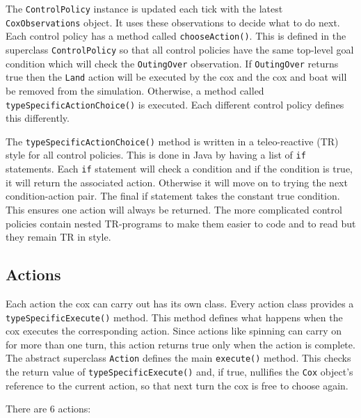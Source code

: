   The \texttt{ControlPolicy} instance is updated each tick with the latest \texttt{CoxObservations} object. It uses these observations to decide what to do next.  Each control policy has a method called \texttt{chooseAction()}. This is defined in the superclass \texttt{ControlPolicy} so that all control policies have the same top-level goal condition which will check the \texttt{OutingOver} observation. If \texttt{OutingOver} returns true then the \texttt{Land} action will be executed by the cox and the cox and boat will be removed from the simulation. Otherwise, a method called \texttt{typeSpecificActionChoice()} is executed. Each different control policy defines this differently. 
  
  The \texttt{typeSpecificActionChoice()} method is written in a teleo-reactive (TR) style for all control policies. This is done in Java by having a list of \texttt{if} statements. Each \texttt{if} statement will check a condition and if the condition is true, it will return the associated action. Otherwise it will move on to trying the next condition-action pair. The final if statement takes the constant true condition. This ensures one action will always be returned. The more complicated control policies contain nested TR-programs to make them easier to code and to read but they remain TR in style. 
  
\subsection{Actions}
  Each action the cox can carry out has its own class. Every action class provides a \texttt{typeSpecificExecute()} method. This method defines what happens when the cox executes the corresponding action. Since actions like spinning can carry on for more than one turn, this action returns true only when the action is complete. The abstract superclass \texttt{Action} defines the main \texttt{execute()} method. This checks the return value of \texttt{typeSpecificExecute()} and, if true, nullifies the \texttt{Cox} object's reference to the current action, so that next turn the cox is free to choose again.

  There are 6 actions:
  
